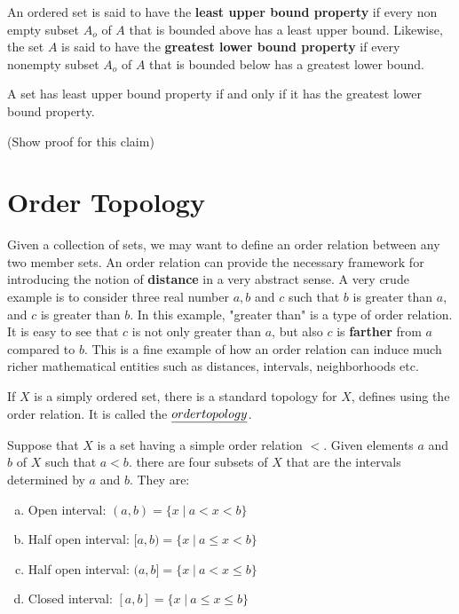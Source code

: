 \documentclass[a4paper,english,12pt]{article}
\begin{document}
\begin{defn}
An ordered set is said to have the \textbf{least upper bound property} if every non empty subset $A_{o}$ of $A$ that is bounded above has a least upper bound. Likewise, the set $A$ is said to have the \textbf{greatest lower bound property} if every nonempty subset $A_{o}$ of $A$ that is bounded below has a greatest lower bound. 
\end{defn}

\begin{rem} A set has least upper bound property if and only if it has the greatest lower bound property. 
\end{rem}(Show proof for this claim)

\section{Order Topology}
Given a collection of sets, we may want to define an order relation between any two member sets. An order relation can provide the necessary framework for introducing the notion of \textbf{distance} in a very abstract sense. A very crude example is to consider three real number $a, b$ and $c$ such that $b$
is greater than $a$, and $c$ is greater than $b$. In this example, "greater than" is a type of order relation. It is easy to see that $c$ is not only greater than $a$, but also $c$ is \textbf{farther} from $a$ compared to $b$. This is a fine example of how an order relation can induce much richer mathematical entities such as distances, intervals, neighborhoods etc.  

If $X$ is a simply ordered set, there is a standard topology for $X$, defines using the order relation. It is called the $\emph{order topology}$.

Suppose that $X$ is a set having a simple order relation $<$. Given elements $a$ and $b$ of $X$ such that $a < b$. there are four subsets of $X$ that are the intervals determined by $a$ and $b$. They are:
\begin{enumerate}[a)]
\item Open interval: $(a, b) = \{ x\; | \: a < x < b  \}$
\item Half open interval: $[a, b) = \{ x\; | \: a \le x < b  \}$
\item Half open interval: $(a, b] = \{ x\; | \: a < x \le b  \}$
\item Closed interval: $[a, b] = \{ x\; | \: a \le x \le b  \}$
\end{enumerate} 
\end{document}
